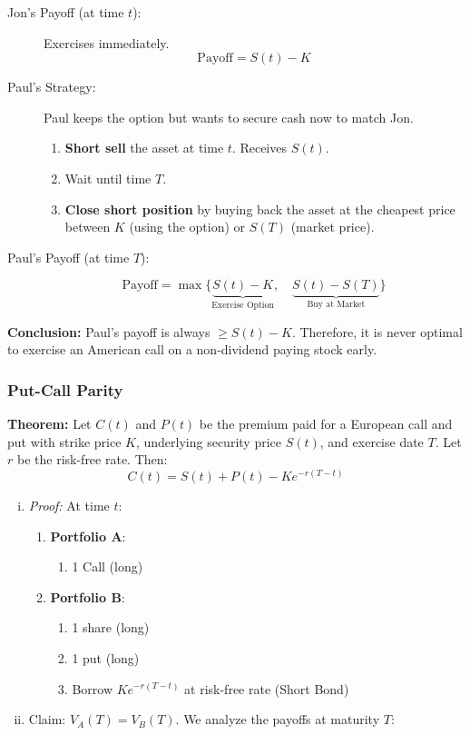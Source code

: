 \begin{description}
    \item[Jon's Payoff (at time $t$):]
    Exercises immediately.
    \[
    \text{Payoff} = S(t) - K
    \]

    \item[Paul's Strategy:]
    Paul keeps the option but wants to secure cash now to match Jon.
    \begin{enumerate}
        \item \textbf{Short sell} the asset at time $t$. Receives $S(t)$.
        \item Wait until time $T$.
        \item \textbf{Close short position} by buying back the asset at the cheapest price between $K$ (using the option) or $S(T)$ (market price).
    \end{enumerate}

    \item[Paul's Payoff (at time $T$):]
    \[
    \text{Payoff} = \max \{ \underbrace{S(t) - K}_{\text{Exercise Option}}, \quad \underbrace{S(t) - S(T)}_{\text{Buy at Market}} \}
    \]
\end{description}

\noindent \textbf{Conclusion:} Paul's payoff is always $\ge S(t) - K$. Therefore, it is never optimal to exercise an American call on a non-dividend paying stock early.

\subsubsection*{Put-Call Parity}
\begin{framed}
\textbf{Theorem: } Let $C(t)$ and $P(t)$ be the premium paid for a European call and put with strike price $K$, underlying security price $S(t)$, and exercise date $T$. Let $r$ be the risk-free rate. Then:
\[
\boxed{C(t) = S(t) + P(t) - K e^{-r(T-t)}}
\]
\end{framed}
\begin{enumerate}[i.]
    \item \textit{Proof: } At time \(t\):
    \begin{enumerate}
        \item \textbf{Portfolio A}:
        \begin{enumerate}
            \item 1 Call (long)
        \end{enumerate}

        \item \textbf{Portfolio B}:
        \begin{enumerate}
            \item 1 share (long)
            \item 1 put (long)
            \item Borrow $Ke^{-r(T-t)}$ at risk-free rate (Short Bond)
        \end{enumerate}
    \end{enumerate}

    \item Claim: $V_A(T) = V_B(T)$. We analyze the payoffs at maturity $T$:
\end{enumerate}


